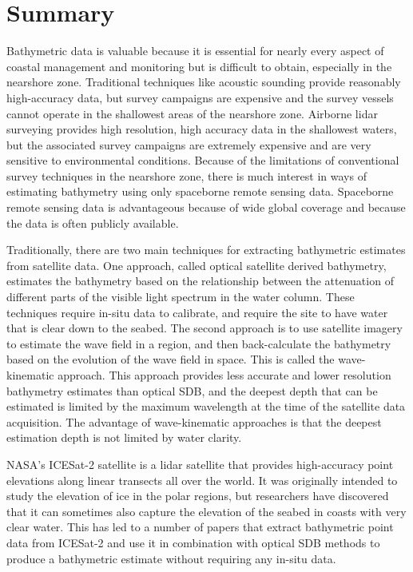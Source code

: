 \chapter*{Summary}

Bathymetric data is valuable because it is essential for nearly every aspect of coastal management and monitoring but is difficult to obtain, especially in the nearshore zone. Traditional techniques like acoustic sounding provide reasonably high-accuracy data, but survey campaigns are expensive and the survey vessels cannot operate in the shallowest areas of the nearshore zone. Airborne lidar surveying provides high resolution, high accuracy data in the shallowest waters, but the associated survey campaigns are extremely expensive and are very sensitive to environmental conditions. Because of the limitations of conventional survey techniques in the nearshore zone, there is much interest in ways of estimating bathymetry using only spaceborne remote sensing data. Spaceborne remote sensing data is advantageous because of wide global coverage and because the data is often publicly available.
\vskip 0.1in

Traditionally, there are two main techniques for extracting bathymetric estimates from satellite data. One approach, called optical satellite derived bathymetry, estimates the bathymetry based on the relationship between the attenuation of different parts of the visible light spectrum in the water column. These techniques require in-situ data to calibrate, and require the site to have water that is clear down to the seabed. The second approach is to use satellite imagery to estimate the wave field in a region, and then back-calculate the bathymetry based on the evolution of the wave field in space. This is called the wave-kinematic approach. This approach provides less accurate and lower resolution bathymetry estimates than optical SDB, and the deepest depth that can be estimated is limited by the maximum wavelength at the time of the satellite data acquisition. The advantage of wave-kinematic approaches is that the deepest estimation depth is not limited by water clarity.
\vskip 0.1in

NASA's ICESat-2 satellite is a lidar satellite that provides high-accuracy point elevations along linear transects all over the world. It was originally intended to study the elevation of ice in the polar regions, but researchers have discovered that it can sometimes also capture the elevation of the seabed in coasts with very clear water. This has led to a number of papers that extract bathymetric point data from ICESat-2 and use it in combination with optical SDB methods to produce a bathymetric estimate without requiring any in-situ data.  
\vskip 0.1in

